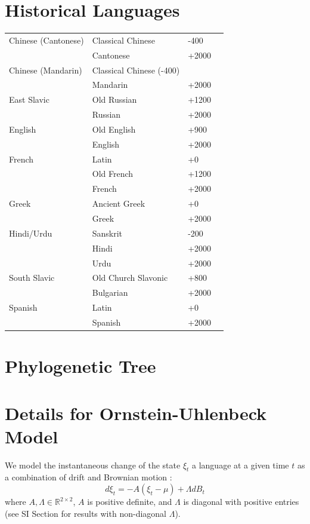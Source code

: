 \documentclass[11pt,a4paper]{article}
\begin{document}



\appendix

\section{Historical Languages}



\begin{tabular}{llll} \hline
Chinese (Cantonese) & Classical Chinese & -400  \\
& Cantonese & +2000\\ \hline
Chinese (Mandarin) & Classical Chinese (-400)  \\
& Mandarin & +2000 \\ \hline
East Slavic & Old Russian & +1200 \\
& Russian & +2000 \\ \hline
English & Old English & +900 \\
& English  & +2000\\ \hline
French & Latin &+0  \\
& Old French &+1200\\
& French  & +2000\\ \hline
Greek & Ancient Greek & +0 \\
& Greek  & +2000\\ \hline
Hindi/Urdu & Sanskrit & -200 \\
& Hindi  & +2000\\
& Urdu  & +2000\\ \hline
South Slavic & Old Church Slavonic & +800 \\
& Bulgarian  & +2000\\ \hline
Spanish & Latin &+0 \\
& Spanish  & +2000\\ \hline
\end{tabular}

\section{Phylogenetic Tree}

\section{Details for Ornstein-Uhlenbeck Model}

We model the instantaneous change of the state $\xi_t$ a language at a given time $t$ as a combination of drift and Brownian motion \citep[p. 109, eq. 4.4.42]{gardiner1983handbook}:
\begin{equation*}
    d\xi_t = -A(\xi_t-\mu) + \Lambda dB_t
\end{equation*}
where $A, \Lambda \in \mathbb{R}^{2\times 2}$, $A$ is positive definite, and $\Lambda$ is diagonal with positive entries (see SI Section for results with non-diagonal $\Lambda$).
\end{document}
